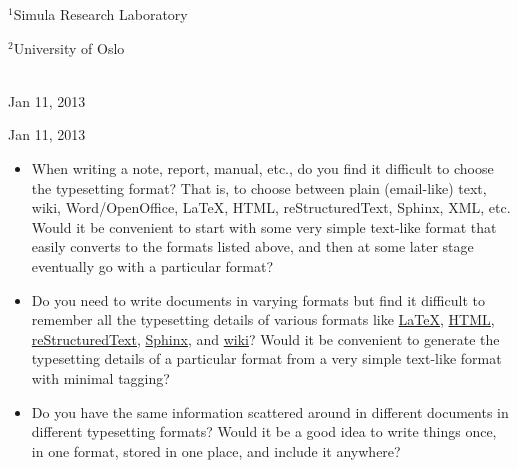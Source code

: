 \documentclass[%
oneside,                 %
final,                   %
chapterprefix=true,      %
open=right               %
10pt]{book}
\begin{document}
\begin{center}
\begin{center}
\centerline{{\small ${}^1$Simula Research Laboratory}}
\centerline{{\small ${}^2$University of Oslo}}
\end{center}





\date{Jan 11, 2013}
\maketitle


\ \\ [10mm]
{\large\textsf{Jan 11, 2013}}

\end{center}
\vfill
\clearpage


\begin{center}
Jan 11, 2013
\end{center}

\vspace{1cm}



\begin{itemize}
 \item When writing a note, report, manual, etc., do you find it difficult
   to choose the typesetting format? That is, to choose between plain
   (email-like) text, wiki, Word/OpenOffice, {\LaTeX}, HTML,
   reStructuredText, Sphinx, XML, etc.  Would it be convenient to
   start with some very simple text-like format that easily converts
   to the formats listed above, and then at some later stage
   eventually go with a particular format?

 \item Do you need to write documents in varying formats but find it
   difficult to remember all the typesetting details of various
   formats like \href{{http://refcards.com/docs/silvermanj/amslatex/LaTeXRefCard.v2.0.pdf}}{LaTeX}, \href{{http://www.htmlcodetutorial.com/}}{HTML}, \href{{http://docutils.sourceforge.net/docs/ref/rst/restructuredtext.html}}{reStructuredText}, \href{{http://sphinx.pocoo.org/contents.html}}{Sphinx}, and \href{{http://code.google.com/p/support/wiki/WikiSyntax}}{wiki}? Would it be convenient
   to generate the typesetting details of a particular format from a
   very simple text-like format with minimal tagging?

 \item Do you have the same information scattered around in different
   documents in different typesetting formats? Would it be a good idea
   to write things once, in one format, stored in one place, and
   include it anywhere?
\end{itemize}
\end{document}
